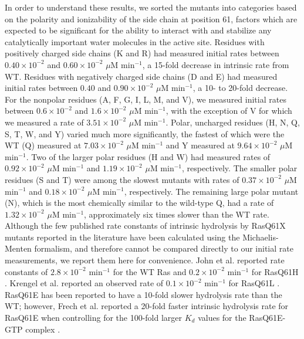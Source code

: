 In order to understand these results, we sorted the mutants into categories based on the polarity and ionizability of the side chain at position 61, factors which are expected to be significant for the ability to interact with and stabilize any catalytically important water molecules in the active site. 
Residues with positively charged side chains (K and R) had measured initial rates between $0.40 \times 10^{-2}$ and $0.60 \times 10^{-2}$ $\mu$M min$^{-1}$, a 15-fold decrease in intrinsic rate from WT. 
Residues with negatively charged side chains (D and E) had measured initial rates between $0.40$ and $0.90 \times 10^{-2}$ $\mu$M min$^{-1}$, a 10- to 20-fold decrease. 
For the nonpolar residues (A, F, G, I, L, M, and V), we measured initial rates between $0.6 \times 10^{-2}$ and $1.6 \times 10^{-2}$ $\mu$M min$^{-1}$, with the exception of V for which we measured a rate of $3.51 \times 10^{-2}$ $\mu$M min$^{-1}$. 
Polar, uncharged residues (H, N, Q, S, T, W, and Y) varied much more significantly, the fastest of which were the WT (Q) measured at $7.03 \times 10^{-2}$ $\mu$M min$^{-1}$ and Y measured at $9.64 \times 10^{-2}$ $\mu$M min$^{-1}$.
Two of the larger polar residues (H and W) had measured rates of $0.92 \times 10^{-2}$ $\mu$M min$^{-1}$ and $1.19 \times 10^{-2}$ $\mu$M min$^{-1}$, respectively. 
The smaller polar residues (S and T) were among the slowest mutants with rates of $0.37 \times 10^{-2}$ $\mu$M min$^{-1}$ and $0.18 \times 10^{-2}$ $\mu$M min$^{-1}$, respectively. 
The remaining large polar mutant (N), which is the most chemically similar to the wild-type Q, had a rate of $1.32 \times 10^{-2}$ $\mu$M min$^{-1}$, approximately six times slower than the WT rate. 
Although the few published rate constants of intrinsic hydrolysis by RasQ61X mutants reported in the literature have been calculated using the Michaelis-Menten formalism, and therefore cannot be compared directly to our initial rate measurements, we report them here for convenience. 
John et al. reported rate constants of $2.8 \times 10^{-2}$ min$^{-1}$ for the WT Ras and $0.2 \times 10^{-2}$ min$^{-1}$ for RasQ61H \cite{John1988}. 
Krengel et al. reported an observed rate of $0.1 \times 10^{-2}$ min$^{-1}$ for RasQ61L \cite{Krengel1990}.
RasQ61E has been reported to have a 10-fold slower hydrolysis rate than the WT\cite{Der1986}; however, Frech et al. reported a 20-fold faster intrinsic hydrolysis rate for RasQ61E when controlling for the 100-fold larger $K_d$ values for the RasQ61E-GTP complex \cite{Frech1994}.


